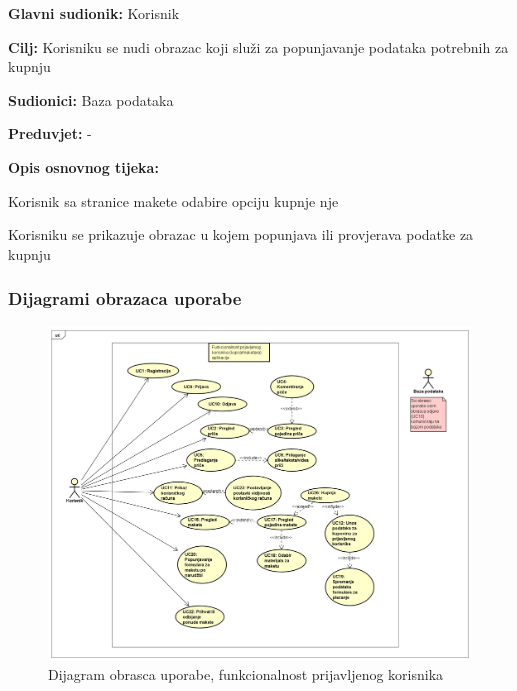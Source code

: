			\noindent {}
			\begin{packed_item}
				
				\item \textbf{Glavni sudionik: }Korisnik
				\item  \textbf{Cilj:} Korisniku se nudi obrazac koji služi za popunjavanje podataka potrebnih za kupnju
				\item  \textbf{Sudionici:} Baza podataka
				\item  \textbf{Preduvjet:} -
				\item  \textbf{Opis osnovnog tijeka:}
				
				\item[] \begin{packed_enum}
					
					\item Korisnik sa stranice makete odabire opciju kupnje nje
					\item Korisniku se prikazuje obrazac u kojem popunjava ili provjerava podatke za kupnju
				\end{packed_enum}
			\end{packed_item}
					
				\subsubsection{Dijagrami obrazaca uporabe}
					
					\begin{figure}[H]
						\includegraphics[width=.9\linewidth]{slike/Funkcionalnost_prijavljenog_korisnika.PNG} %
						\caption{Dijagram obrasca uporabe, funkcionalnost prijavljenog korisnika}
						\label{fig:obrupo1} %
					\end{figure}
				\eject		
				
